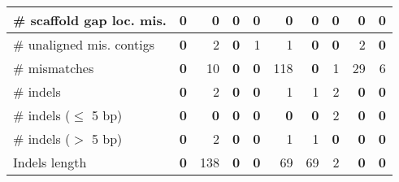 \documentclass[12pt,a4paper]{article}
\begin{document}
\begin{table}[ht]
\begin{center}
\begin{tabular}{|l*{9}{|r}|}
\# scaffold gap loc. mis. & 0 & 0 & 0 & 0 & 0 & 0 & 0 & 0 & 0 \\ \hline
\# unaligned mis. contigs & {\bf 0} & 2 & {\bf 0} & 1 & 1 & {\bf 0} & {\bf 0} & 2 & {\bf 0} \\ \hline
\# mismatches & {\bf 0} & 10 & {\bf 0} & {\bf 0} & 118 & {\bf 0} & 1 & 29 & 6 \\ \hline
\# indels & {\bf 0} & 2 & {\bf 0} & {\bf 0} & 1 & 1 & 2 & {\bf 0} & {\bf 0} \\ \hline
\hspace{5mm}\# indels ($\leq$ 5 bp) & {\bf 0} & {\bf 0} & {\bf 0} & {\bf 0} & {\bf 0} & {\bf 0} & 2 & {\bf 0} & {\bf 0} \\ \hline
\hspace{5mm}\# indels ($>$ 5 bp) & {\bf 0} & 2 & {\bf 0} & {\bf 0} & 1 & 1 & {\bf 0} & {\bf 0} & {\bf 0} \\ \hline
Indels length & {\bf 0} & 138 & {\bf 0} & {\bf 0} & 69 & 69 & 2 & {\bf 0} & {\bf 0} \\ \hline
\end{tabular}
\end{center}
\end{table}
\end{document}
